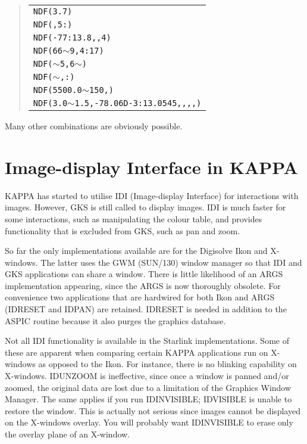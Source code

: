 {\small
\begin{quote}
\begin{center}
\begin{tabular}{l}
{\tt NDF(3.7)}\\
{\tt NDF(,5:)}\\
{\tt NDF(-77:13.8,,4)}\\
{\tt NDF(66}$\sim${\tt 9,4:17)}\\
{\tt NDF(}$\sim${\tt 5,6}$\sim${\tt )}\\
{\tt NDF(}$\sim${\tt ,:)}\\
{\tt NDF(5500.0}$\sim${\tt 150,)}\\
{\tt NDF(3.0}$\sim${\tt 1.5,-78.06D-3:13.0545,,,,)}\\
\end{tabular}
\end{center}
\end{quote}
\normalsize

Many other combinations are obviously possible.

\section{Image-display Interface in KAPPA}

{\small KAPPA} has started to utilise IDI (Image-display Interface) for
interactions with images.  However, GKS is still called to display
images. IDI is much faster for some interactions, such as manipulating
the colour table, and provides functionality that is excluded from GKS,
such as pan and zoom.

So far the only implementations available are for the Digisolve Ikon and
X-windows.  The latter uses the GWM (SUN/130) window manager so that IDI
and GKS applications can share a window.  There is little likelihood of
an ARGS implementation appearing, since the ARGS is now thoroughly
obsolete.  For convenience two applications that are hardwired for both
Ikon and ARGS (IDRESET and IDPAN) are retained.  IDRESET is needed in
addition to the {\small ASPIC} routine because it also purges the
graphics database. 

Not all IDI functionality is available in the Starlink implementations. 
Some of these are apparent when comparing certain {\small KAPPA}
applications run on X-windows as opposed to the Ikon.  For instance,
there is no blinking capability on X-windows.  IDUNZOOM is ineffective,
since once a window is panned and/or zoomed, the original data are lost
due to a limitation of the Graphics Window Manager.  The same applies if
you run IDINVISIBLE; IDVISIBLE is unable to restore the window.  This is
actually not serious since images cannot be displayed on the X-windows
overlay.  You will probably want IDINVISIBLE to erase only the overlay
plane of an X-window.

}
